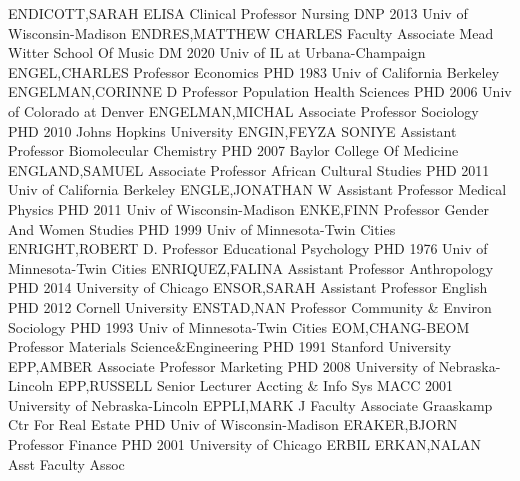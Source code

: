 \documentclass[
]{article}
\begin{document}
\textbar ENDICOTT,SARAH ELISA \textbar Clinical Professor
\textbar Nursing \textbar{}  \textbar DNP 2013 Univ of
Wisconsin-Madison \textbar ENDRES,MATTHEW CHARLES \textbar Faculty
Associate \textbar Mead Witter School Of Music \textbar{} 
\textbar DM 2020 Univ of IL at Urbana-Champaign \textbar ENGEL,CHARLES
\textbar Professor \textbar Economics \textbar{} 
\textbar PHD 1983 Univ of California Berkeley \textbar ENGELMAN,CORINNE
D \textbar Professor \textbar Population Health Sciences \textbar{}
 \textbar PHD 2006 Univ of Colorado at Denver
\textbar ENGELMAN,MICHAL \textbar Associate Professor \textbar Sociology
\textbar{}  \textbar PHD 2010 Johns Hopkins University
\textbar ENGIN,FEYZA SONIYE \textbar Assistant Professor
\textbar Biomolecular Chemistry \textbar{}  \textbar PHD 2007
Baylor College Of Medicine \textbar ENGLAND,SAMUEL \textbar Associate
Professor \textbar African Cultural Studies \textbar{} 
\textbar PHD 2011 Univ of California Berkeley \textbar ENGLE,JONATHAN W
\textbar Assistant Professor \textbar Medical Physics \textbar{}
 \textbar PHD 2011 Univ of Wisconsin-Madison
\textbar ENKE,FINN \textbar Professor \textbar Gender And Women Studies
\textbar{}  \textbar PHD 1999 Univ of Minnesota-Twin Cities
\textbar ENRIGHT,ROBERT D. \textbar Professor \textbar Educational
Psychology \textbar{}  \textbar PHD 1976 Univ of
Minnesota-Twin Cities \textbar ENRIQUEZ,FALINA \textbar Assistant
Professor \textbar Anthropology \textbar{}  \textbar PHD 2014
University of Chicago \textbar ENSOR,SARAH \textbar Assistant Professor
\textbar English \textbar{}  \textbar PHD 2012 Cornell
University \textbar ENSTAD,NAN \textbar Professor \textbar Community \&
Environ Sociology \textbar{}  \textbar PHD 1993 Univ of
Minnesota-Twin Cities \textbar EOM,CHANG-BEOM \textbar Professor
\textbar Materials Science\&Engineering \textbar{} 
\textbar PHD 1991 Stanford University \textbar EPP,AMBER
\textbar Associate Professor \textbar Marketing \textbar{} 
\textbar PHD 2008 University of Nebraska-Lincoln \textbar EPP,RUSSELL
\textbar Senior Lecturer \textbar Accting \& Info Sys \textbar{}
 \textbar MACC 2001 University of Nebraska-Lincoln
\textbar EPPLI,MARK J \textbar Faculty Associate \textbar Graaskamp Ctr
For Real Estate \textbar{}  \textbar PHD Univ of
Wisconsin-Madison \textbar ERAKER,BJORN \textbar Professor
\textbar Finance \textbar{}  \textbar PHD 2001 University of
Chicago \textbar ERBIL ERKAN,NALAN \textbar Asst Faculty Assoc
\end{document}
